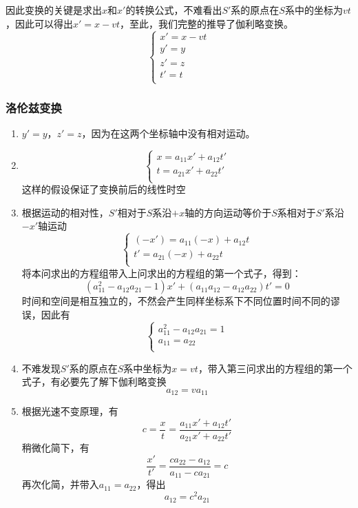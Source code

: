 \documentclass[UTF8]{ctexart}
\numberwithin{equation}{section}
\begin{document}
因此变换的关键是求出$x$和$x'$的转换公式，不难看出$S'$系的原点在$S$系中的坐标为$vt$，因此可以得出$x' = x - vt$，至此，我们完整的推导了伽利略变换。
\[
\begin{cases}
    x' = x - vt\\
    y' = y\\
    z' = z\\
    t' = t\\
\end{cases}
\]

\newpage
\subsubsection{洛伦兹变换}
\begin{enumerate}
    \item $y' = y$，$z' = z$，因为在这两个坐标轴中没有相对运动。
    \item 
    \[
    \begin{cases}
    x = a_{11}x' + a_{12}t'\\
    t = a_{21} x' +a_{22}t'\\
    \end{cases}
    \]
    这样的假设保证了变换前后的线性时空
    \item 根据运动的相对性，$S'$相对于$S$系沿$+x$轴的方向运动等价于$S$系相对于$S'$系沿$-x'$轴运动
    \[
    \begin{cases}
    (-x')= a_{11}(-x) + a_{12}t\\
    t' = a_{21} (-x) +a_{22}t\\
    \end{cases}
    \]
    将本问求出的方程组带入上问求出的方程组的第一个式子，得到：
    \[
    (a_{11}^2 - a_{12}a_{21} - 1) x' + (a_{11}a_{12} - a_{12}a_{22})t' = 0
    \]
    时间和空间是相互独立的，不然会产生同样坐标系下不同位置时间不同的谬误，因此有
    \[
    \begin{cases}
    a_{11}^2 - a_{12}a_{21} = 1\\
    a_{11} = a_{22}\\
    \end{cases}
    \]

    \item 不难发现$S'$系的原点在$S$系中坐标为$x = vt$，带入第三问求出的方程组的第一个式子，有必要先了解下伽利略变换
    \[
    a_{12} = v a_{11}
    \]

    \item 根据光速不变原理，有
    \[
    c = \frac{x}{t} = \frac{a_{11} x' + a_{12} t'}{a_{21} x' + a_{22} t'}
    \]
    稍微化简下，有
    \[
    \frac{x'}{t'} = \frac{ca_{22} - a_{12}}{a_{11} - ca_{21}} = c
    \]
    再次化简，并带入$a_{11} = a_{22}$，得出
    \[
    a_{12} = c^2 a_{21}
    \]


\end{enumerate}
\end{document}
